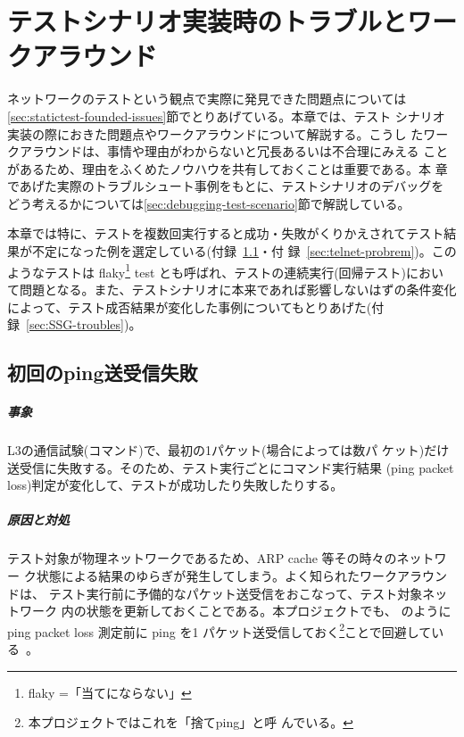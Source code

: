 
\chapter{テストシナリオ実装時のトラブルとワークアラウンド}
\label{cpt:troubles}

ネットワークのテストという観点で実際に発見できた問題点については
\ref{sec:statictest-founded-issues}節でとりあげている。本章では、テスト
シナリオ実装の際におきた問題点やワークアラウンドについて解説する。こうし
たワークアラウンドは、事情や理由がわからないと冗長あるいは不合理にみえる
ことがあるため、理由をふくめたノウハウを共有しておくことは重要である。本
章であげた実際のトラブルシュート事例をもとに、テストシナリオのデバッグを
どう考えるかについては\ref{sec:debugging-test-scenario}節で解説している。

本章では特に、テストを複数回実行すると成功・失敗がくりかえされてテスト結
果が不定になった例を選定している(付録~\ref{sec:ping-probrem}・付
録~\ref{sec:telnet-probrem})。このようなテストは flaky\footnote{flaky
=「当てにならない」} test とも呼ばれ、テストの連続実行(回帰テスト)におい
て問題となる。また、テストシナリオに本来であれば影響しないはずの条件変化
によって、テスト成否結果が変化した事例についてもとりあげた(付
録~\ref{sec:SSG-troubles})。

 \section{初回のping送受信失敗}
 \label{sec:ping-probrem}

    \paragraph{事象}
L3の通信試験(コマンド)で、最初の1パケット(場合によっては数パ
ケット)だけ送受信に失敗する。そのため、テスト実行ごとにコマンド実行結果
(ping packet loss)判定が変化して、テストが成功したり失敗したりする。

    \paragraph{原因と対処}
テスト対象が物理ネットワークであるため、ARP cache 等その時々のネットワー
ク状態による結果のゆらぎが発生してしまう。よく知られたワークアラウンドは、
テスト実行前に予備的なパケット送受信をおこなって、テスト対象ネットワーク
内の状態を更新しておくことである。本プロジェクトでも、
のように ping packet loss 測定前に ping を1
パケット送受信しておく\footnote{本プロジェクトではこれを「捨てping」と呼
んでいる。}ことで回避している~\cite{examples-pr49}。

